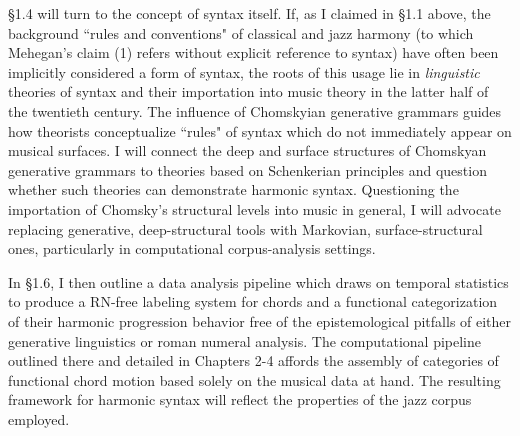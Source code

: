 \S 1.4 will turn to the concept of syntax itself.  If, as I claimed in \S 1.1 above, the background ``rules and conventions" of classical and jazz harmony (to which Mehegan's claim (1) refers without explicit reference to syntax) have often been implicitly considered a form of syntax, the roots of this usage lie in \emph{linguistic} theories of syntax and their importation into music theory in the latter half of the twentieth century. The influence of Chomskyian generative grammars guides how theorists conceptualize ``rules" of syntax which do not immediately appear on musical surfaces.  I will connect the deep and surface structures of Chomskyan generative grammars to theories based on Schenkerian principles and question whether such theories can demonstrate harmonic syntax.  Questioning the importation of Chomsky's structural levels into music in general, I will advocate replacing generative, deep-structural tools with Markovian, surface-structural ones, particularly in computational corpus-analysis settings.

In \S 1.6, I then outline a data analysis pipeline which draws on temporal statistics to produce a RN-free labeling system for chords and a functional categorization of their harmonic progression behavior free of the epistemological pitfalls of either generative linguistics or roman numeral analysis.  The computational pipeline outlined there and detailed in Chapters 2-4 affords the assembly of categories of functional chord motion based solely on the musical data at hand.  The resulting framework for harmonic syntax will reflect the properties of the jazz corpus employed.

